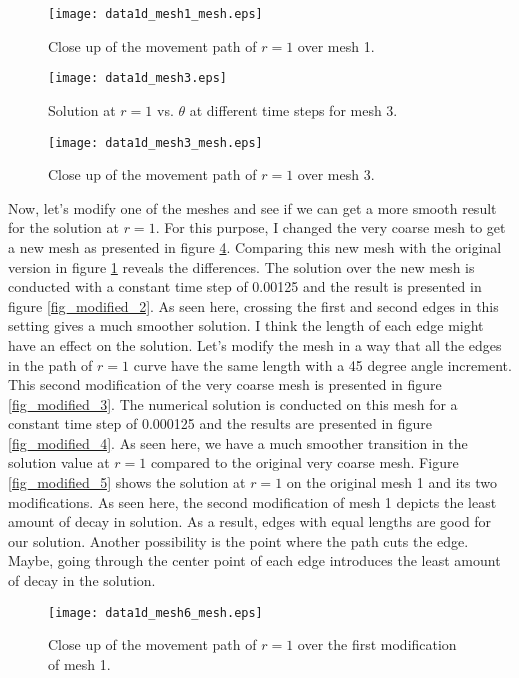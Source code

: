 \documentclass{article}
\begin{document}
\begin{figure}[H]
\centering
\texttt{[image: data1d\_mesh1\_mesh.eps]}
\caption{Close up of the movement path of $r=1$ over mesh 1.}
\label{fig_tr1_theta_mesh_1}
\end{figure}

\begin{figure}[H]
\centering
\texttt{[image: data1d\_mesh3.eps]}
\caption{Solution at $r=1$ vs. $\theta$ at different time steps for mesh 3.}
\label{fig_tr1_theta_2}
\end{figure}

\begin{figure}[H]
\centering
\texttt{[image: data1d\_mesh3\_mesh.eps]}
\caption{Close up of the movement path of $r=1$ over mesh 3.}
\label{fig_tr1_theta_mesh_2}
\end{figure}

Now, let's modify one of the meshes and see if we can get a more smooth result for the solution at $r=1$. For this purpose, I changed the very coarse mesh to get a new mesh as presented in figure \ref{fig_modified_1}. Comparing this new mesh with the original version in figure \ref{fig_tr1_theta_mesh_1} reveals the differences. The solution over the new mesh is conducted with a constant time step of 0.00125 and the result is presented in figure \ref{fig_modified_2}. As seen here, crossing the first and second edges in this setting gives a much smoother solution. I think the length of each edge might have an effect on the solution. Let's modify the mesh in a way that all the edges in the path of $r=1$ curve have the same length with a 45 degree angle increment. This second modification of the very coarse mesh is presented in figure \ref{fig_modified_3}. The numerical solution is conducted on this mesh for a constant time step of 0.000125 and the results are presented in figure \ref{fig_modified_4}. As seen here, we have a much smoother transition in the solution value at $r=1$ compared to the original very coarse mesh. Figure \ref{fig_modified_5} shows the solution at $r=1$ on the original mesh 1 and its two modifications. As seen here, the second modification of mesh 1 depicts the least amount of decay in solution. As a result, edges with equal lengths are good for our solution. Another possibility is the point where the path cuts the edge. Maybe, going through the center point of each edge introduces the least amount of decay in the solution.

\begin{figure}[H]
\centering
\texttt{[image: data1d\_mesh6\_mesh.eps]}
\caption{Close up of the movement path of $r=1$ over the first modification of mesh 1.}
\label{fig_modified_1}
\end{figure}
\end{document}
